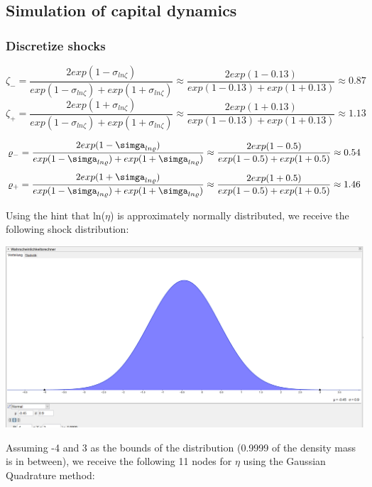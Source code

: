 \documentclass[12pt,a4paper]{article}
\begin{document}
\newpage
\subsection{Simulation of capital dynamics}
\subsubsection{Discretize shocks}
\vspace{1cm}
\begin{equation*}
    \zeta_-=\frac{2exp(1-\sigma_{ln\zeta})}{exp(1-\sigma_{ln\zeta})+exp(1+\sigma_{ln\zeta})}\approx\frac{2exp(1-0.13)}{exp(1-0.13)+exp(1+0.13)}\approx 0.87
    \end{equation*}
    \begin{equation*}
       \zeta_+=\frac{2exp(1+\sigma_{ln\zeta})}{exp(1-\sigma_{ln\zeta})+exp(1+\sigma_{ln\zeta})}\approx\frac{2exp(1+0.13)}{exp(1-0.13)+exp(1+0.13)}\approx 1.13
    \end{equation*}

\vspace{1cm}
\begin{equation*}
    \varrho_-=\frac{2exp(1-\simga_{ln\varrho})}{exp(1-\simga_{ln\varrho})+exp(1+\simga_{ln\varrho})}\approx\frac{2exp(1-0.5)}{exp(1-0.5)+exp(1+0.5)}\approx 0.54
    \end{equation*}
    \begin{equation*}
       \varrho_+=\frac{2exp(1+\simga_{ln\varrho})}{exp(1-\simga_{ln\varrho})+exp(1+\simga_{ln\varrho})}\approx\frac{2exp(1+0.5)}{exp(1-0.5)+exp(1+0.5)}\approx 1.46
    \end{equation*}

\vspace{1cm}
Using the hint that ln($\eta$) is approximately normally distributed, we receive the following shock distribution:

\begin{center}
    \includegraphics[width=15cm]{eta_shocks.png}\\
\end{center}
\newpage
Assuming -4 and 3 as the bounds of the distribution (0.9999 of the density mass is in between), we receive the following 11 nodes for $\eta$ using the Gaussian Quadrature method:\\
\end{document}
